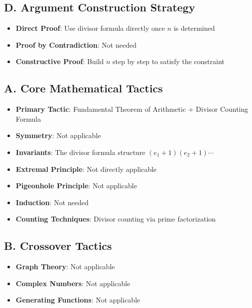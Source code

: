 \documentclass[]{article}
\begin{document}
\begin{strategicbox}
\subsection*{D. Argument Construction Strategy}
\begin{itemize}[leftmargin=*]
    \item \textbf{Direct Proof}: Use divisor formula directly once $n$ is determined
    \item \textbf{Proof by Contradiction}: Not needed
    \item \textbf{Constructive Proof}: Build $n$ step by step to satisfy the constraint
\end{itemize}
\end{strategicbox}

\begin{tacticalbox}
\subsection*{A. Core Mathematical Tactics}
\begin{itemize}[leftmargin=*]
    \item \textbf{Primary Tactic}: Fundamental Theorem of Arithmetic + Divisor Counting Formula
    \item \textbf{Symmetry}: Not applicable
    \item \textbf{Invariants}: The divisor formula structure $(e_1+1)(e_2+1)\cdots$
    \item \textbf{Extremal Principle}: Not directly applicable
    \item \textbf{Pigeonhole Principle}: Not applicable
    \item \textbf{Induction}: Not needed
    \item \textbf{Counting Techniques}: Divisor counting via prime factorization
\end{itemize}

\subsection*{B. Crossover Tactics}
\begin{itemize}[leftmargin=*]
    \item \textbf{Graph Theory}: Not applicable
    \item \textbf{Complex Numbers}: Not applicable
    \item \textbf{Generating Functions}: Not applicable
\end{itemize}
\end{tacticalbox}
\end{document}

